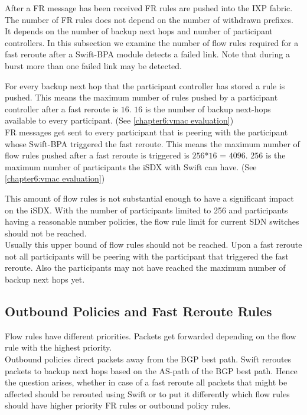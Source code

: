 After a FR message has been received FR rules are pushed into the IXP fabric. The number of FR rules does not depend on the number of withdrawn prefixes. It depends on the number of backup next hops and number of participant controllers. 
In this subsection we examine the number of flow rules required for a fast reroute after a Swift-BPA module detects a failed link. Note that during a burst more than one failed link may be detected. 

For every backup next hop that the participant controller has stored a rule is pushed. This means the maximum number of rules pushed by a participant controller after a fast reroute is $16$. $16$ is the number of backup next-hops available to every participant. (See \ref{chapter6:vmac evaluation}) \\
FR messages get sent to every participant that is peering with the participant whose Swift-BPA triggered the fast reroute. This means the maximum number of flow rules pushed after a fast reroute is triggered is $256$*$16$ = $4096$. $256$ is the maximum number of participants the iSDX with Swift can have. (See \ref{chapter6:vmac evaluation}) 

This amount of flow rules is not substantial enough to have a significant impact on the iSDX. With the number of participants limited to 256 and participants having a reasonable number policies, the flow rule limit for current SDN switches should not be reached. \cite[Figure 3 (a)]{gupta2016industrial}\\
Usually this upper bound of flow rules should not be reached. Upon a fast reroute not all participants will be peering with the participant that triggered the fast reroute. Also the participants may not have reached the maximum number of backup next hops yet.

\newpage

\subsection{\label{chapter6:number of flow rules:outbound_FR}Outbound Policies and Fast Reroute Rules}

Flow rules have different priorities. Packets get forwarded depending on the flow rule with the highest priority. \\
Outbound policies direct packets away from the BGP best path. Swift reroutes packets to backup next hops based on the AS-path of the BGP best path. Hence the question arises, whether in case of a fast reroute all packets that might be affected should be rerouted using Swift or to put it differently which flow rules should have higher priority FR rules or outbound policy rules.

